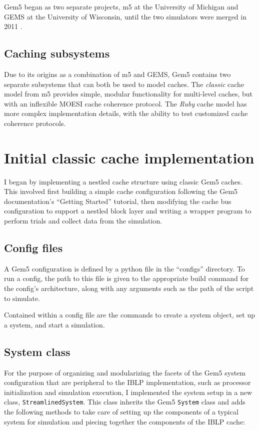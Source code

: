 \documentclass[12pt,twoside]{reedthesis}
\begin{document}
Gem5 began as two separate projects, m5 at the University of Michigan and GEMS at the University of Wisconsin, until the two simulators were merged in 2011 \cite{gem5-about}.

	\subsection*{Caching subsystems}

	Due to its origins as a combination of m5 and GEMS, Gem5 contains two separate subsystems that can both be used to model caches. The \textit{classic} cache model from m5 provides simple, modular functionality for multi-level caches, but with an inflexible MOESI cache coherence protocol. The \textit{Ruby} cache model has more complex implementation details, with the ability to test customized cache coherence protocols.

\section{Initial classic cache implementation}

	I began by implementing a nestled cache structure using classic Gem5 caches. This involved first building a simple cache configuration following the Gem5 documentation's ``Getting Started'' tutorial, then modifying the cache bus configuration to support a nestled block layer and writing a wrapper program to perform trials and collect data from the simulation.

	\subsection*{Config files}

	A Gem5 configuration is defined by a python file in the ``configs'' directory. To run a config, the path to this file is given to the appropriate build command for the config's architecture, along with any arguments such as the path of the script to simulate.
	
	Contained within a config file are the commands to create a system object, set up a system, and start a simulation.

	\subsection*{System class}

	For the purpose of organizing and modularizing the facets of the Gem5 system configuration that are peripheral to the IBLP implementation, such as processor initialization and simulation execution, I implemented the system setup in a new class, \verb`StreamlinedSystem`. This class inherits the Gem5 \verb`System` class and adds the following methods to take care of setting up the components of a typical system for simulation and piecing together the components of the IBLP cache:
\end{document}

